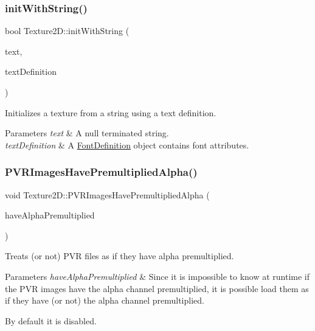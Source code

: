 \subsubsection{\texorpdfstring{init\+With\+String()}{initWithString()}\hspace{0.1cm}{\footnotesize\ttfamily [4/4]}}
{\footnotesize\ttfamily bool Texture2\+D\+::init\+With\+String (\begin{DoxyParamCaption}\item[{const char $\ast$}]{text,  }\item[{const \hyperlink{structFontDefinition}{Font\+Definition} \&}]{text\+Definition }\end{DoxyParamCaption})}

Initializes a texture from a string using a text definition.


\begin{DoxyParams}{Parameters}
{\em text} & A null terminated string. \\
\hline
{\em text\+Definition} & A \hyperlink{structFontDefinition}{Font\+Definition} object contains font attributes. \\
\hline
\end{DoxyParams}
\mbox{\label{classTexture2D_a62ab6fca303a92c550ad28fafd52bb6e}} 
\subsubsection{\texorpdfstring{P\+V\+R\+Images\+Have\+Premultiplied\+Alpha()}{PVRImagesHavePremultipliedAlpha()}\hspace{0.1cm}{\footnotesize\ttfamily [1/2]}}
{\footnotesize\ttfamily void Texture2\+D\+::\+P\+V\+R\+Images\+Have\+Premultiplied\+Alpha (\begin{DoxyParamCaption}\item[{bool}]{have\+Alpha\+Premultiplied }\end{DoxyParamCaption})\hspace{0.3cm}{\ttfamily [static]}}

Treats (or not) P\+VR files as if they have alpha premultiplied.


\begin{DoxyParams}{Parameters}
{\em have\+Alpha\+Premultiplied} & Since it is impossible to know at runtime if the P\+VR images have the alpha channel premultiplied, it is possible load them as if they have (or not) the alpha channel premultiplied.\\
\hline
\end{DoxyParams}
By default it is disabled.

